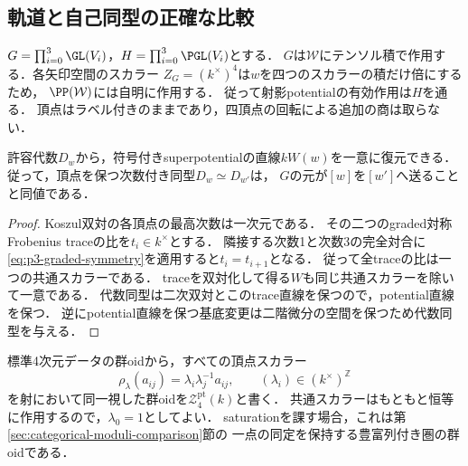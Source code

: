 \subsection{軌道と自己同型の正確な比較}

$G=\prod_{i=0}^3\GL(V_i)$，$H=\prod_{i=0}^3\PGL(V_i)$とする．
$G$は$\mathcal W$にテンソル積で作用する．各矢印空間のスカラー
$Z_G=(k^\times)^4$は$w$を四つのスカラーの積だけ倍にするため，
$\PP(\mathcal W)$には自明に作用する．
従って射影potentialの有効作用は$H$を通る．
頂点はラベル付きのままであり，四頂点の回転による追加の商は取らない．

\begin{lemma}[potential直線の一意性]
\label{lem:p3-potential-unique}
許容代数$D_w$から，符号付きsuperpotentialの直線$kW(w)$を一意に復元できる．
従って，頂点を保つ次数付き同型$D_w\simeq D_{w'}$は，
$G$の元が$[w]$を$[w']$へ送ることと同値である．
\end{lemma}
\begin{proof}
Koszul双対の各頂点の最高次数は一次元である．
その二つのgraded対称Frobenius traceの比を$t_i\in k^\times$とする．
隣接する次数1と次数3の完全対合に
\eqref{eq:p3-graded-symmetry}を適用すると$t_i=t_{i+1}$となる．
従って全traceの比は一つの共通スカラーである．
traceを双対化して得る$W$も同じ共通スカラーを除いて一意である．
代数同型は二次双対とこのtrace直線を保つので，potential直線を保つ．
逆にpotential直線を保つ基底変更は二階微分の空間を保つため代数同型を与える．
\end{proof}

標準4次元データの群oidから，すべての頂点スカラー
\[
 \rho_\lambda(a_{ij})=\lambda_i\lambda_j^{-1}a_{ij},
 \qquad(\lambda_i)\in(k^\times)^{\mathbb Z}
\]
を射において同一視した群oidを$\mathcal Z_4^{\mathrm{pt}}(k)$と書く．
共通スカラーはもともと恒等に作用するので，$\lambda_0=1$としてよい．
saturationを課す場合，これは第\ref{sec:categorical-moduli-comparison}節の
一点の同定を保持する豊富列付き圏の群oidである．

